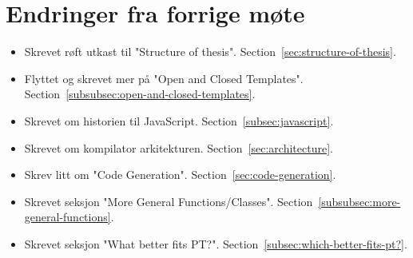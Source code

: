 
\chapter*{Endringer fra forrige møte}

\begin{itemize}
    \item Skrevet røft utkast til "Structure of thesis".
    Section~\vref{sec:structure-of-thesis}.
    \item Flyttet og skrevet mer på "Open and Closed Templates".
    Section~\vref{subsubsec:open-and-closed-templates}.
    \item Skrevet om historien til JavaScript.
    Section~\vref{subsec:javascript}.
    \item Skrevet om kompilator arkitekturen.
    Section~\vref{sec:architecture}.
    \item Skrev litt om "Code Generation".
    Section~\vref{sec:code-generation}.
    \item Skrevet seksjon "More General Functions/Classes".
    Section~\vref{subsubsec:more-general-functions}.
    \item Skrevet seksjon "What better fits PT?".
    Section~\vref{subsec:which-better-fits-pt?}.
\end{itemize}

